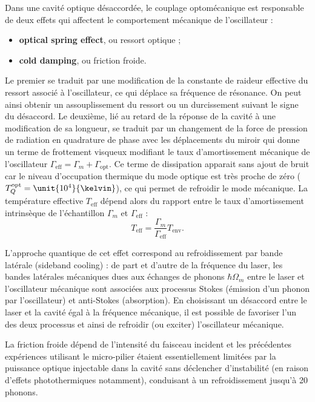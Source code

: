 \documentclass[12pt,a4paper]{article}
\begin{document}
Dans une cavité optique désaccordée, le couplage optomécanique est responsable de deux effets qui affectent le comportement mécanique de l'oscillateur : 
\begin{itemize}
\item \textbf{optical spring effect}, ou ressort optique ;
\item \textbf{cold damping}, ou friction froide.
\end{itemize}
Le premier se traduit par une modification de la constante de raideur effective du ressort associé à l'oscillateur, ce qui déplace sa fréquence de résonance.
On peut ainsi obtenir un assouplissement du ressort ou un durcissement suivant le signe du désaccord.
Le deuxième, lié au retard de la réponse de la cavité à une modification de sa longueur, se traduit par un changement de la force de pression de radiation en quadrature de phase avec les déplacements du miroir qui donne un terme de frottement visqueux modifiant le taux d'amortissement mécanique de l'oscillateur $\Gamma_\mathrm{eff} = \Gamma_m + \Gamma_\mathrm{opt}$.
Ce terme de dissipation apparait sans ajout de bruit car le niveau d'occupation thermique du mode optique est très proche de zéro ($T_Q^\mathrm{opt}=\unit{10^4}{\kelvin}$), ce qui permet de refroidir le mode mécanique.
La température effective $T_\mathrm{eff}$ dépend alors du rapport entre le taux d'amortissement intrinsèque de l'échantillon $\Gamma_m$ et $\Gamma_\mathrm{eff}$ :
\begin{equation}
T_\mathrm{eff} = \frac{\Gamma_m}{\Gamma_\mathrm{eff}} T_\mathrm{env}.
\end{equation}

L'approche quantique de cet effet correspond au refroidissement par bande latérale (sideband cooling) : de part et d'autre de la fréquence du laser, les bandes latérales mécaniques dues aux échanges de phonons $\hbar\Omega_m$ entre le laser et l'oscillateur mécanique sont associées aux processus Stokes (émission d'un phonon par l'oscillateur) et anti-Stokes (absorption).
En choisissant un désaccord entre le laser et la cavité égal à la fréquence mécanique, il est possible de favoriser l'un des deux processus et ainsi de refroidir (ou exciter) l'oscillateur mécanique. 

La friction froide dépend de l'intensité du faisceau incident et les précédentes expériences utilisant le micro-pilier étaient essentiellement limitées par la puissance optique injectable dans la cavité sans déclencher d'instabilité (en raison d'effets photothermiques notamment), conduisant à un refroidissement jusqu'à 20 phonons.
\end{document}
